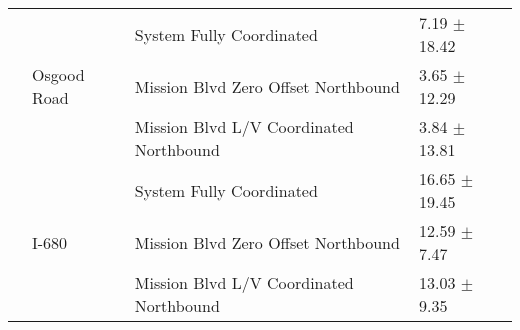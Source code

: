 \begin{tabular}{llll}
 & \multirow[t]{3}{*}{Osgood Road} & System Fully Coordinated & 7.19 $\pm$ 18.42 \\
 &  & Mission Blvd Zero Offset Northbound & 3.65 $\pm$ 12.29 \\
 &  & Mission Blvd L/V Coordinated Northbound & 3.84 $\pm$ 13.81 \\
 & \multirow[t]{3}{*}{I-680} & System Fully Coordinated & 16.65 $\pm$ 19.45 \\
 &  & Mission Blvd Zero Offset Northbound & 12.59 $\pm$ 7.47 \\
 &  & Mission Blvd L/V Coordinated Northbound & 13.03 $\pm$ 9.35 \\
\bottomrule
\end{tabular}
